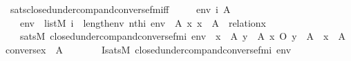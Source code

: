 \begin{isabellebody}
\isanewline
{}\isamarkupfalse%
\ sats{\isacharunderscore}{\kern0pt}closed{\isacharunderscore}{\kern0pt}under{\isacharunderscore}{\kern0pt}comp{\isacharunderscore}{\kern0pt}and{\isacharunderscore}{\kern0pt}converse{\isacharunderscore}{\kern0pt}fm{\isacharunderscore}{\kern0pt}iff\ {\isacharcolon}{\kern0pt}\ \isanewline
\ \ \ env\ i\ A\isanewline
\ \ \ {\isachardoublequoteopen}env\ {\isasymin}\ list{\isacharparenleft}{\kern0pt}M{\isacharparenright}{\kern0pt}{\isachardoublequoteclose}\ {\isachardoublequoteopen}i\ {\isacharless}{\kern0pt}\ length{\isacharparenleft}{\kern0pt}env{\isacharparenright}{\kern0pt}{\isachardoublequoteclose}\ {\isachardoublequoteopen}nth{\isacharparenleft}{\kern0pt}i{\isacharcomma}{\kern0pt}\ env{\isacharparenright}{\kern0pt}\ {\isacharequal}{\kern0pt}\ A{\isachardoublequoteclose}\ {\isachardoublequoteopen}{\isasymAnd}x{\isachardot}{\kern0pt}\ x\ {\isasymin}\ A\ {\isasymLongrightarrow}\ relation{\isacharparenleft}{\kern0pt}x{\isacharparenright}{\kern0pt}{\isachardoublequoteclose}\ \isanewline
\ \ \ {\isachardoublequoteopen}sats{\isacharparenleft}{\kern0pt}M{\isacharcomma}{\kern0pt}\ closed{\isacharunderscore}{\kern0pt}under{\isacharunderscore}{\kern0pt}comp{\isacharunderscore}{\kern0pt}and{\isacharunderscore}{\kern0pt}converse{\isacharunderscore}{\kern0pt}fm{\isacharparenleft}{\kern0pt}i{\isacharparenright}{\kern0pt}{\isacharcomma}{\kern0pt}\ env{\isacharparenright}{\kern0pt}\ {\isasymlongleftrightarrow}\ {\isacharparenleft}{\kern0pt}{\isasymforall}x\ {\isasymin}\ A{\isachardot}{\kern0pt}\ {\isasymforall}y\ {\isasymin}\ A{\isachardot}{\kern0pt}\ x\ O\ y\ {\isasymin}\ A{\isacharparenright}{\kern0pt}\ {\isasymand}\ {\isacharparenleft}{\kern0pt}{\isasymforall}x\ {\isasymin}\ A{\isachardot}{\kern0pt}\ converse{\isacharparenleft}{\kern0pt}x{\isacharparenright}{\kern0pt}\ {\isasymin}\ A{\isacharparenright}{\kern0pt}{\isachardoublequoteclose}\ \isanewline
%
\isadelimproof
\isanewline
%
\endisadelimproof
%
\isatagproof
{}\isamarkupfalse%
\ {\isacharminus}{\kern0pt}\ \isanewline
\ \ \isamarkupfalse%
\ I{}{\isacharcolon}{\kern0pt}{\isachardoublequoteopen}sats{\isacharparenleft}{\kern0pt}M{\isacharcomma}{\kern0pt}\ closed{\isacharunderscore}{\kern0pt}under{\isacharunderscore}{\kern0pt}comp{\isacharunderscore}{\kern0pt}and{\isacharunderscore}{\kern0pt}converse{\isacharunderscore}{\kern0pt}fm{\isacharparenleft}{\kern0pt}i{\isacharparenright}{\kern0pt}{\isacharcomma}{\kern0pt}\ env{\isacharparenright}{\kern0pt}\ {\isasymlongleftrightarrow}\ \isanewline

\end{isabellebody}
